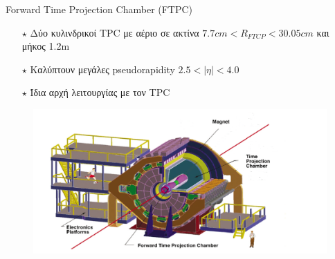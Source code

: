 \documentclass[18pt,notheorems,hyperref={pdfauthor=whatever}]{beamer}
\begin{document}
%
%
%

\begin{frame}{Forward Time Projection Chamber (FTPC)}
     \begin{minipage}{0.4\textwidth}
        \begin{itemize}
            \item[$\star$] Δύο κυλινδρικοί TPC με αέριο σε ακτίνα $7.7cm<R_{FTCP}<30.05cm$ και μήκος 1.2m
            \item[$\star$] Καλύπτουν μεγάλες pseudorapidity $2.5<|\eta|<4.0$
            \item[$\star$] Ίδια αρχή λειτουργίας με τον TPC 
        \end{itemize}
    \end{minipage}
    \begin{minipage}{0.5\textwidth}
      
        \begin{figure}
            \centering
            \includegraphics[scale=0.5]{images/Star_FTPC.png}
        \end{figure}
    \end{minipage}
\end{frame}
\end{document}
